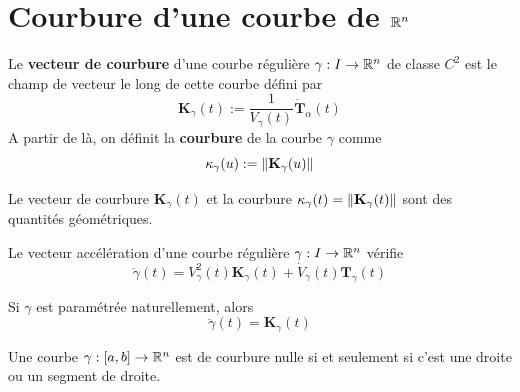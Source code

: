 \section{Courbure d'une courbe de $\mathbb{R}^n$}

\begin{definition}
	Le \textbf{vecteur de courbure} d'une courbe régulière $\gamma : I \to \mathbb{R}^n$ de classe $C^2$ est le champ de vecteur le long de cette courbe défini par
	\[
	\bm K_\gamma(t) := \frac1{V_\gamma(t)} \dot{\bm T}_\alpha(t)
	\]
	A partir de là, on définit la \textbf{courbure} de la courbe $\gamma$ comme
	\[
	\kappa_\gamma(u) := \left\| \mathbf{K}_\gamma (u) \right\|
	\]
\end{definition}

\begin{proposition}
	Le vecteur de courbure $\bm K_\gamma(t)$ et la courbure $\kappa_\gamma(t) = \left\| \mathbf{K}_\gamma(t) \right\|$ sont des quantités géométriques.
\end{proposition}



\begin{lemme} \label{lem: le vecteur accéleration selon la courbure}
	Le vecteur accélération d'une courbe régulière $\gamma : I \to \mathbb{R}^n$ vérifie
	\[
	\ddot \gamma(t) = V_\gamma^2(t) \bm K_\gamma(t) + \dot V_\gamma(t) \bm T_\gamma(t)
	\]
\end{lemme}


\begin{theoreme} \label{thm: vecteur de courbure d'une courbe régulière}
	Si $\gamma$ est paramétrée naturellement, alors
	\[
	\ddot \gamma(t) = \bm K_\gamma(t)
	\]
\end{theoreme}



\begin{corollaire}
	Une courbe $\gamma : [a,b] \to \mathbb{R}^n$ est de courbure nulle si et seulement si c'est une droite ou un segment de droite.
\end{corollaire}

